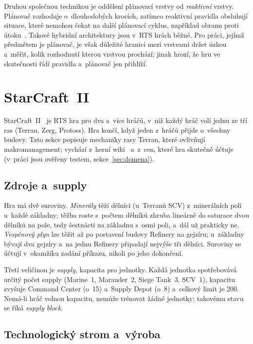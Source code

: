 Druhou společnou technikou je oddělení plánovací vrstvy od \emph{reaktivní} vrstvy. Plánovač rozhoduje o~dlouhodobých krocích, zatímco reaktivní pravidla obsluhují situace, které nemohou čekat na další plánovací cyklus, například obranu proti útoku~\cite{Duarte2020}. Takové hybridní architektury jsou v~RTS hrách běžné. Pro práci, jejímž předmětem je plánovač, je však důležité hranici mezi vrstvami držet úzkou a~měřit, kolik rozhodnutí kterou vrstvou prochází; jinak hrozí, že hru ve skutečnosti řídí pravidla a~plánovač jen přihlíží.

\section{StarCraft~II}
\label{sec:sc2}

StarCraft~II~\cite{Starcraft2} je RTS hra pro dva a~více hráčů, v~níž každý hráč volí jednu ze tří ras (Terran, Zerg, Protoss). Hra končí, když jeden z~hráčů přijde o~všechny budovy. Tato sekce popisuje mechaniky rasy Terran, které ovlivňují makromanagement; vychází z~herní wiki~\cite{Starcraft2wiki} a~z~cen, které hra skutečně účtuje (v~práci jsou ověřeny testem, sekce~\ref{sec:domena}).

\subsection{Zdroje a~supply}

Hra má dvě suroviny. \emph{Minerály} těží dělníci (u~Terranů SCV) z~minerálních polí u~každé základny; těžba roste s~počtem dělníků zhruba lineárně do saturace dvou dělníků na pole, tedy šestnácti na základnu s~osmi poli, a~dál už prakticky ne. \emph{Vespénový plyn} lze těžit až po postavení budovy Refinery na gejzíru; u~základny bývají dva gejzíry a~na jednu Refinery připadají nejvýše tři dělníci. Suroviny se účtují v~okamžiku zadání příkazu, nikoli po jeho dokončení.

Třetí veličinou je \emph{supply}, kapacita pro jednotky. Každá jednotka spotřebovává určitý počet supply (Marine~1, Marauder~2, Siege Tank~3, SCV~1), kapacitu zvyšuje Command Center (o~15) a~Supply Depot (o~8) a~celkový limit je 200. Nemá-li hráč volnou kapacitu, nemůže trénovat žádné jednotky; takovému stavu se říká \emph{supply block}.

\subsection{Technologický strom a~výroba}

